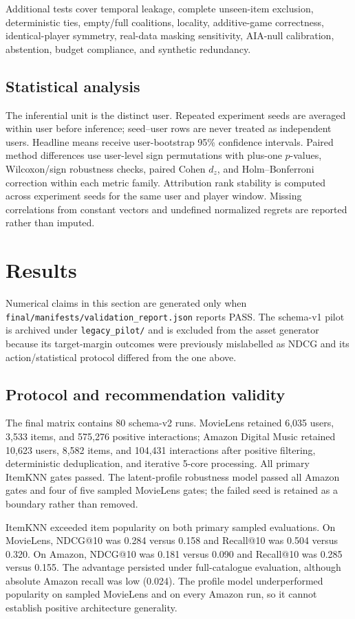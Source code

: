\documentclass[11pt]{article}
\begin{document}
Additional tests cover temporal leakage, complete unseen-item exclusion, deterministic ties, empty/full coalitions, locality, additive-game correctness, identical-player symmetry, real-data masking sensitivity, AIA-null calibration, abstention, budget compliance, and synthetic redundancy.

\subsection{Statistical analysis}
The inferential unit is the distinct user. Repeated experiment seeds are averaged within user before inference; seed--user rows are never treated as independent users. Headline means receive user-bootstrap 95\% confidence intervals. Paired method differences use user-level sign permutations with plus-one $p$-values, Wilcoxon/sign robustness checks, paired Cohen $d_z$, and Holm--Bonferroni correction within each metric family. Attribution rank stability is computed across experiment seeds for the same user and player window. Missing correlations from constant vectors and undefined normalized regrets are reported rather than imputed.

\section{Results}
Numerical claims in this section are generated only when \texttt{final/manifests/validation\_report.json} reports PASS. The schema-v1 pilot is archived under \texttt{legacy\_pilot/} and is excluded from the asset generator because its target-margin outcomes were previously mislabelled as NDCG and its action/statistical protocol differed from the one above.

\subsection{Protocol and recommendation validity}
The final matrix contains 80 schema-v2 runs. MovieLens retained 6,035 users, 3,533 items, and 575,276 positive interactions; Amazon Digital Music retained 10,623 users, 8,582 items, and 104,431 interactions after positive filtering, deterministic deduplication, and iterative 5-core processing. All primary ItemKNN gates passed. The latent-profile robustness model passed all Amazon gates and four of five sampled MovieLens gates; the failed seed is retained as a boundary rather than removed.

ItemKNN exceeded item popularity on both primary sampled evaluations. On MovieLens, NDCG@10 was 0.284 versus 0.158 and Recall@10 was 0.504 versus 0.320. On Amazon, NDCG@10 was 0.181 versus 0.090 and Recall@10 was 0.285 versus 0.155. The advantage persisted under full-catalogue evaluation, although absolute Amazon recall was low (0.024). The profile model underperformed popularity on sampled MovieLens and on every Amazon run, so it cannot establish positive architecture generality.
\end{document}

